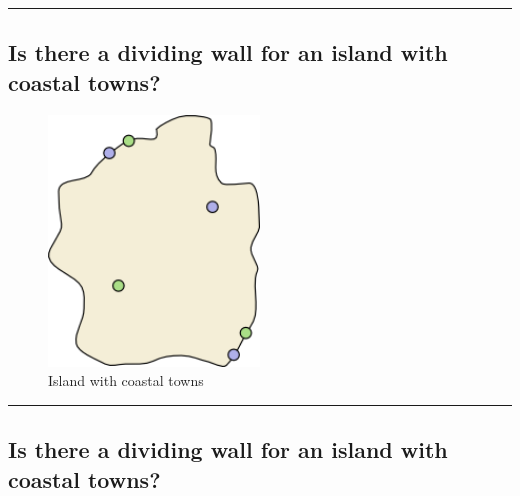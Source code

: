 \documentclass[
  letterpaper,
  DIV=11,
  numbers=noendperiod]{scrartcl}
\begin{document}
\begin{center}\rule{0.5\linewidth}{0.5pt}\end{center}

\hypertarget{is-there-a-dividing-wall-for-an-island-with-coastal-towns}{%
\subsection{Is there a dividing wall for an island with coastal
towns?}\label{is-there-a-dividing-wall-for-an-island-with-coastal-towns}}

\begin{figure}

{\centering \includegraphics[width=0.5\textwidth,height=\textheight]{wall-3.png}

}

\caption{Island with coastal towns}

\end{figure}

\begin{center}\rule{0.5\linewidth}{0.5pt}\end{center}

\hypertarget{is-there-a-dividing-wall-for-an-island-with-coastal-towns-1}{%
\subsection{Is there a dividing wall for an island with coastal
towns?}\label{is-there-a-dividing-wall-for-an-island-with-coastal-towns-1}}
\end{document}
